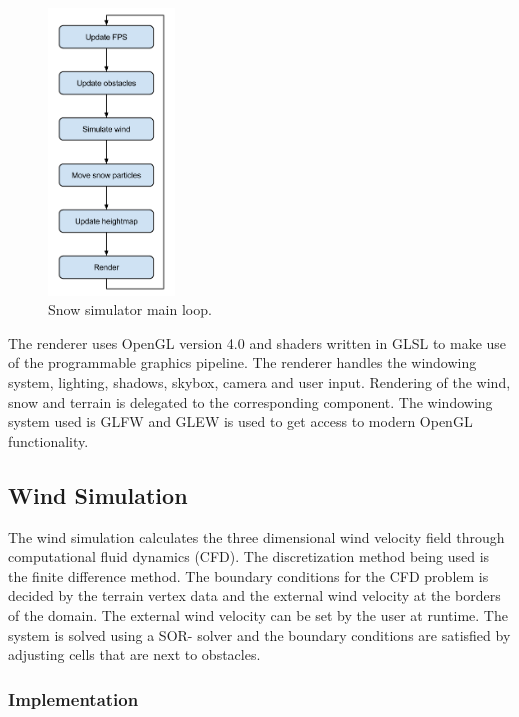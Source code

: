 \begin{figure}[ht]
	\center
	\includegraphics[width=0.30\textwidth]{images/snow_sim_main_loop}
	\caption{Snow simulator main loop.}
	\label{fig:mainLoop}
\end{figure}

The renderer uses OpenGL version 4.0 and shaders written in GLSL to make use of 
the programmable graphics pipeline. The renderer handles the windowing system, 
lighting, shadows, skybox, camera and user input. Rendering of the wind, snow and 
terrain is delegated to the corresponding component. The windowing system used 
is GLFW and GLEW is used to get access to modern OpenGL functionality. 

\subsection{Wind Simulation}

The wind simulation calculates the three dimensional wind velocity field through
computational fluid dynamics (CFD). The discretization method being used is the
finite difference method. The boundary conditions for the CFD problem is decided
by the terrain vertex data and the external wind velocity at the borders of the
domain. The external wind velocity can be set by the user at runtime. The system
is solved using a SOR- solver and the boundary conditions are satisfied by
adjusting cells that are next to obstacles.

\subsubsection{Implementation}

